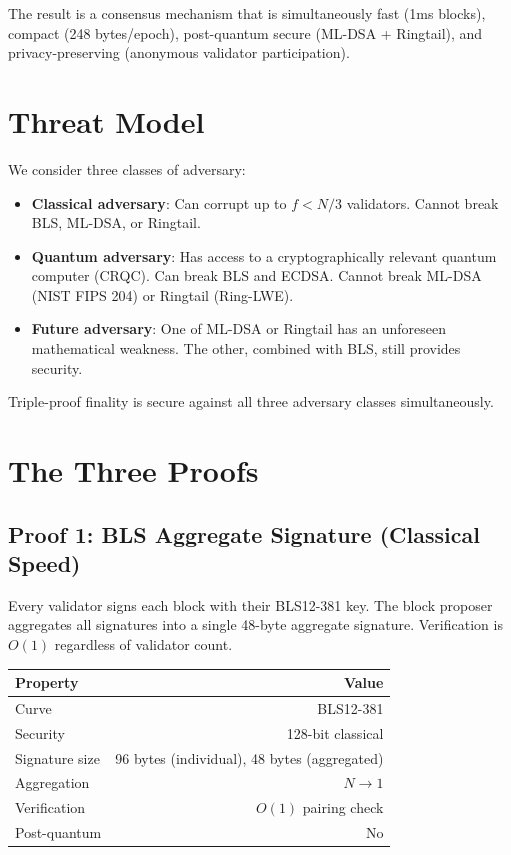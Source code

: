 \documentclass[11pt,a4paper]{article}
\begin{document}
The result is a consensus mechanism that is simultaneously fast (1ms blocks), compact (248 bytes/epoch), post-quantum secure (ML-DSA + Ringtail), and privacy-preserving (anonymous validator participation).

\section{Threat Model}

We consider three classes of adversary:

\begin{itemize}[leftmargin=2em]
\item \textbf{Classical adversary}: Can corrupt up to $f < N/3$ validators. Cannot break BLS, ML-DSA, or Ringtail.
\item \textbf{Quantum adversary}: Has access to a cryptographically relevant quantum computer (CRQC). Can break BLS and ECDSA. Cannot break ML-DSA (NIST FIPS 204) or Ringtail (Ring-LWE).
\item \textbf{Future adversary}: One of ML-DSA or Ringtail has an unforeseen mathematical weakness. The other, combined with BLS, still provides security.
\end{itemize}

Triple-proof finality is secure against all three adversary classes simultaneously.

\section{The Three Proofs}

\subsection{Proof 1: BLS Aggregate Signature (Classical Speed)}

Every validator signs each block with their BLS12-381 key. The block proposer aggregates all signatures into a single 48-byte aggregate signature. Verification is $O(1)$ regardless of validator count.

\begin{center}
\begin{tabular}{lr}
\toprule
\textbf{Property} & \textbf{Value} \\
\midrule
Curve & BLS12-381 \\
Security & 128-bit classical \\
Signature size & 96 bytes (individual), 48 bytes (aggregated) \\
Aggregation & $N \to 1$ \\
Verification & $O(1)$ pairing check \\
Post-quantum & No \\
\bottomrule
\end{tabular}
\end{center}
\end{document}
